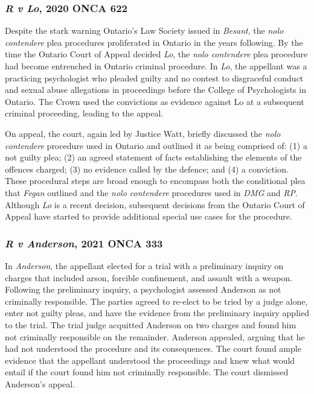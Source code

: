 \subsubsection{\textit{R v Lo}, 2020 ONCA 622}

Despite the stark warning Ontario's Law Society issued in \textit{Besant}, the \textit{nolo contendere} plea procedures proliferated in Ontario in the years following. By the time the Ontario Court of Appeal decided \textit{Lo}, the \textit{nolo contendere} plea procedure had become entrenched in Ontario criminal procedure. In \textit{Lo}, the appellant was a practicing psychologist who pleaded guilty and no contest to disgraceful conduct and sexual abuse allegations in proceedings before the College of Psychologists in Ontario. The Crown used the convictions as evidence against Lo at a subsequent criminal proceeding, leading to the appeal.

On appeal, the court, again led by Justice Watt, briefly discussed the \textit{nolo contendere} procedure used in Ontario and outlined it as being comprised of: (1) a not guilty plea; (2) an agreed statement of facts establishing the elements of the offences charged; (3) no evidence called by the defence; and (4) a conviction. These procedural steps are broad enough to encompass both the conditional plea that \textit{Fegan} outlined and the \textit{nolo contendere} procedures used in \textit{DMG} and \textit{RP}. Although \textit{Lo} is a recent decision, subsequent decisions from the Ontario Court of Appeal have started to provide additional special use cases for the procedure.

\subsubsection{\textit{R v Anderson}, 2021 ONCA 333}

In \textit{Anderson}, the appellant elected for a trial with a preliminary inquiry on charges that included arson, forcible confinement, and assault with a weapon. Following the preliminary inquiry, a psychologist assessed Anderson as not criminally responsible. The parties agreed to re-elect to be tried by a judge alone, enter not guilty pleas, and have the evidence from the preliminary inquiry applied to the trial. The trial judge acquitted Anderson on two charges and found him not criminally responsible on the remainder. Anderson appealed, arguing that he had not understood the procedure and its consequences. The court found ample evidence that the appellant understood the proceedings and knew what would entail if the court found him not criminally responsible. The court dismissed Anderson's appeal. 

